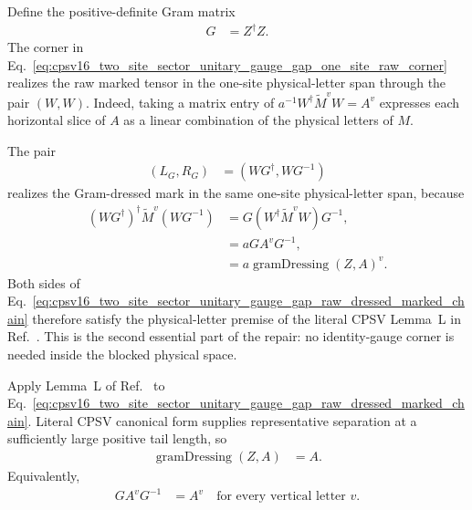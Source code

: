 \documentclass{article}
\begin{document}
Define the positive-definite Gram matrix
\begin{align}
    G
    &=Z^\dagger Z.
    \label{eq:cpsv16_two_site_sector_unitary_gauge_gap_gram_matrix}
\end{align}
The corner in
Eq.~\ref{eq:cpsv16_two_site_sector_unitary_gauge_gap_one_site_raw_corner}
realizes the raw marked tensor in the one-site physical-letter span through
the pair $(W,W)$. Indeed, taking a matrix entry of
$a^{-1}W^\dagger\widetilde M^vW=A^v$ expresses each horizontal slice of $A$
as a linear combination of the physical letters of $M$.

The pair
\begin{align}
    (L_G,R_G)
    &=(WG^\dagger,WG^{-1})
    \label{eq:cpsv16_two_site_sector_unitary_gauge_gap_gram_pair}
\end{align}
realizes the Gram-dressed mark in the same one-site physical-letter span,
because
\begin{align}
    (WG^\dagger)^\dagger\widetilde M^v(WG^{-1})
    &=G(W^\dagger\widetilde M^vW)G^{-1},
    \label{eq:cpsv16_two_site_sector_unitary_gauge_gap_gram_compression_first}\\
    &=aGA^vG^{-1},
    \label{eq:cpsv16_two_site_sector_unitary_gauge_gap_gram_compression_second}\\
    &=a\operatorname{gramDressing}(Z,A)^v.
    \label{eq:cpsv16_two_site_sector_unitary_gauge_gap_gram_one_site_compression}
\end{align}
Both sides of
Eq.~\ref{eq:cpsv16_two_site_sector_unitary_gauge_gap_raw_dressed_marked_chain}
therefore satisfy the physical-letter premise of the literal CPSV Lemma~L in
Ref.~\cite{Cirac2016MPDO_arXiv}. This is the second essential part of the
repair: no identity-gauge corner is needed inside the blocked physical space.

Apply Lemma~L of Ref.~\cite{Cirac2016MPDO_arXiv} to
Eq.~\ref{eq:cpsv16_two_site_sector_unitary_gauge_gap_raw_dressed_marked_chain}.
Literal CPSV canonical form supplies representative separation at a
sufficiently large positive tail length, so
\begin{align}
    \operatorname{gramDressing}(Z,A)
    &=A.
    \label{eq:cpsv16_two_site_sector_unitary_gauge_gap_gram_dressing_target}
\end{align}
Equivalently,
\begin{align}
    GA^vG^{-1}
    &=A^v
    \quad\text{for every vertical letter }v.
    \label{eq:cpsv16_two_site_sector_unitary_gauge_gap_gram_commutation}
\end{align}
\end{document}
